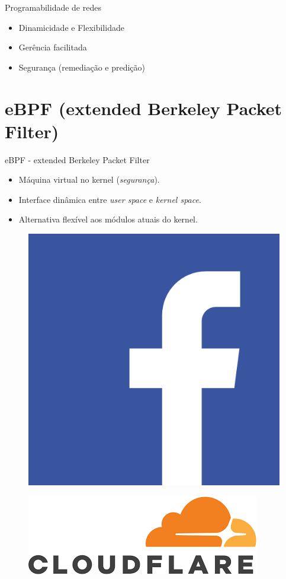 \begin{frame}{Programabilidade de redes}
	\begin{itemize}
	    \item Dinamicidade e Flexibilidade
	    \item Gerência facilitada
		\item Segurança (remediação e predição)
		\end{itemize} 
\end{frame}


\section{eBPF (extended Berkeley Packet Filter)}
\begin{frame}{eBPF - extended Berkeley Packet Filter}
\begin{itemize}
		\item Máquina virtual no kernel (\textit{segurança}).
		\item Interface dinâmica entre \textit{user space} e \textit{kernel space}.
		\item Alternativa flexível aos módulos atuais do kernel.
	\end{itemize} 
\begin{figure}
\centering
\begin{minipage}{.5\textwidth}
  \centering
  \includegraphics[width=.4\linewidth]{img/proj_tcc/facebook-logo.png}
  \label{figure:facebook}
\end{minipage}%
\begin{minipage}{.5\textwidth}
  \centering
  \vspace{28pt}  %
  \includegraphics[width=.6\linewidth]{img/proj_tcc/cloudflare.png}
  \label{figure:cloudflare}
\end{minipage}
\end{figure}	
\end{frame}

